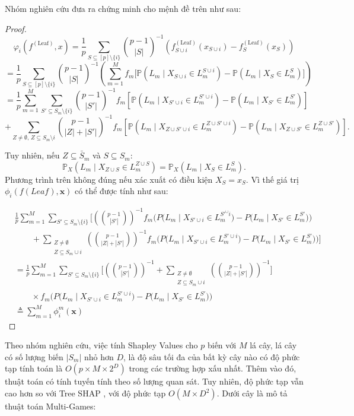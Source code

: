 \documentclass[12pt, a4paper]{article}
\theoremstyle{plain}
\theoremstyle{proposition}
\theoremstyle{lemma}
\begin{document}
Nhóm nghiên cứu đưa ra chứng minh cho mệnh đề trên như sau:
\begin{proof}
\[
\varphi_i(f^{(\text{Leaf})}, x) =
\frac{1}{p} \sum_{S \subseteq [p]\setminus\{i\}}
\binom{p-1}{|S|}^{-1}
\left( f^{(\text{Leaf})}_{S \cup i}(x_{S \cup i}) - f^{(\text{Leaf})}_S(x_S) \right)
\]
\[
= \frac{1}{p} \sum_{S \subseteq [p]\setminus\{i\}}
\binom{p-1}{|S|}^{-1}
\left( \sum_{m=1}^M f_m \big[ \mathbb{P}(L_m \mid X_{S \cup i} \in L_m^{S \cup i}) 
- \mathbb{P}(L_m \mid X_S \in L_m^S) \big] \right)
\]
\[
= \frac{1}{p} \sum_{m=1}^M \sum_{S' \subseteq S_m \setminus \{i\}}
\binom{p-1}{|S'|}^{-1} f_m
\left[ \mathbb{P}(L_m \mid X_{S' \cup i} \in L_m^{S' \cup i})
- \mathbb{P}(L_m \mid X_{S'} \in L_m^{S'}) \right]
\]
\[
+ \sum_{Z \neq \emptyset,\, Z \subseteq S_m \setminus i}
\binom{p-1}{|Z|+|S'|}^{-1} f_m
\left[ \mathbb{P}(L_m \mid X_{Z \cup S' \cup i} \in L_m^{Z \cup S' \cup i})
- \mathbb{P}(L_m \mid X_{Z \cup S'} \in L_m^{Z \cup S'}) \right].
\]

Tuy nhiên, nếu $Z \subseteq \bar S_m$ và $S \subseteq S_m$:
\[
\mathbb{P}_X(L_m \mid X_{Z \cup S} \in L_m^{Z \cup S}) 
= \mathbb{P}_X(L_m \mid X_S \in L_m^S).
\tag{15}
\]
Phương trình trên không đúng nếu xác xuất có điều kiện $X_S = x_S$. Vì thế giá trị $\phi_i(f(Leaf), \mathbf{x})$ có thể được tính như sau:

\begin{align*}
& \frac{1}{p} \sum_{m=1}^{M} \sum_{S' \subseteq S_m \setminus \{i\}}
\Bigg[
\left( \binom{p-1}{|S'|} \right)^{-1} f_m 
\Big(
P\big(L_m \mid X_{S' \cup i} \in L_m^{S'^ \cup i} \big) 
- P\big(L_m \mid X_{S'} \in L_m^{S'} \big)
\Big) \\
& \qquad + \sum_{\substack{Z \neq \emptyset \\ Z \subseteq S_m \cup i}}
\left( \binom{p-1}{|Z| + |S'|} \right)^{-1} f_m
\Big(
P\big(L_m \mid X_{S' \cup i} \in L_m^{S' \cup i} \big) 
- P\big(L_m \mid X_{S'} \in L_m^{S'} \big)
\Big)
\Bigg] \\
&= \frac{1}{p} \sum_{m=1}^{M} \sum_{S' \subseteq S_m \setminus \{i\}}
\Bigg[
\left( \binom{p-1}{|S'|} \right)^{-1} 
+ \sum_{\substack{Z \neq \emptyset \\ Z \subseteq S_m \cup i}}
\left( \binom{p-1}{|Z| + |S'|} \right)^{-1}
\Bigg] \\
& \qquad
\times f_m 
\Big(
P\big(L_m \mid X_{S' \cup i} \in L_m^{S' \cup i} \big) 
- P\big(L_m \mid X_{S'} \in L_m^{S'} \big)
\Big) \\
& \triangleq \sum_{m=1}^{M} \phi_i^m(\mathbf{x})
\end{align*}
\end{proof}
Theo nhóm nghiên cứu, việc tính Shapley Values cho $p$ biến với $M$ lá cây, lá cây có số lượng biến $|S_m|$ nhỏ hơn $D$, là độ sâu tối đa của bất kỳ
cây nào có độ phức tạp tính toán là $O(p \times M \times 2^D)$
trong các trường hợp xấu nhất. Thêm vào đó, thuật toán có tính tuyến tính theo số lượng quan sát. Tuy nhiên, độ phức tạp vẫn cao hơn so với Tree
SHAP , với độ phức tạp $O(M \times D^2)$. Dưới cây là mô tả thuật toán Multi-Games:
\end{document}
